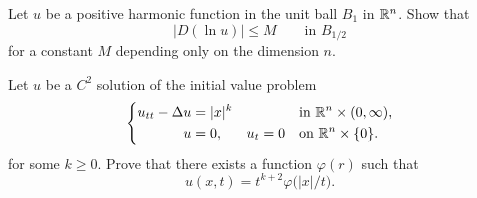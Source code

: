 \begin{problem}
  Let \(u\) be a positive harmonic function in the unit ball \(B_1\) in
  \(\mathbb{R}^n\). Show that
  \[
    \bigl|D(\ln u)\bigr|\leq M\qquad \text{in \(B_{1/2}\)}
  \]
  for a constant \(M\) depending only on the dimension \(n\).

\end{problem}
\begin{solution}
\end{solution}

\begin{problem}
  Let \(u\) be a \(C^2\) solution of the initial value problem
  \[
    \left\{
    \begin{aligned}
      u_{tt}-\Delta u&=|x|^k&&&&\text{in \(\mathbb{R}^n\times(0,\infty)\),}\\
      u&=0,&u_t&=0&&\text{on \(\mathbb{R}^n\times\{0\}\)}.
    \end{aligned}
    \right.
  \]
  for some \(k\geq 0\). Prove that there exists a function \(\varphi(r)\)
  such that
  \[
    u(x,t)=t^{k+2}\varphi\bigl(|x|/t\bigr).
  \]

  \noindent [\emph{Hint:} As one of the steps show that \(u\) is
  \((k+2)\)-homogeneous in \((x,t)\) variables, i.e.,
  \(u(\lambda x,\lambda t)=\lambda^{k+2}u(x,t)\) for any \(\lambda >0\).]
\end{problem}
\begin{solution}
\end{solution}

